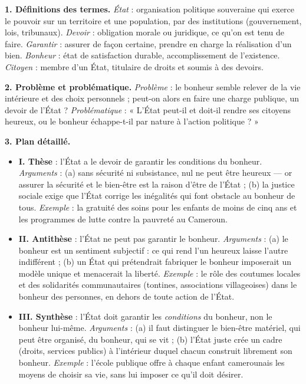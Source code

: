 \documentclass[11pt]{article}
\begin{document}
\begin{corrige}
\textbf{1. Définitions des termes.}
\emph{État} : organisation politique souveraine qui exerce le pouvoir sur un territoire et une population, par des institutions (gouvernement, lois, tribunaux). \emph{Devoir} : obligation morale ou juridique, ce qu'on est tenu de faire. \emph{Garantir} : assurer de façon certaine, prendre en charge la réalisation d'un bien. \emph{Bonheur} : état de satisfaction durable, accomplissement de l'existence. \emph{Citoyen} : membre d'un État, titulaire de droits et soumis à des devoirs.

\textbf{2. Problème et problématique.}
\emph{Problème} : le bonheur semble relever de la vie intérieure et des choix personnels ; peut-on alors en faire une charge publique, un devoir de l'État ? \emph{Problématique} : « L'État peut-il et doit-il rendre ses citoyens heureux, ou le bonheur échappe-t-il par nature à l'action politique ? »

\textbf{3. Plan détaillé.}
\begin{itemize}
\item \textbf{I. Thèse} : l'État a le devoir de garantir les conditions du bonheur. \emph{Arguments} : (a) sans sécurité ni subsistance, nul ne peut être heureux — or assurer la sécurité et le bien-être est la raison d'être de l'État ; (b) la justice sociale exige que l'État corrige les inégalités qui font obstacle au bonheur de tous. \emph{Exemple} : la gratuité des soins pour les enfants de moins de cinq ans et les programmes de lutte contre la pauvreté au Cameroun.
\item \textbf{II. Antithèse} : l'État ne peut pas garantir le bonheur. \emph{Arguments} : (a) le bonheur est un sentiment subjectif : ce qui rend l'un heureux laisse l'autre indifférent ; (b) un État qui prétendrait fabriquer le bonheur imposerait un modèle unique et menacerait la liberté. \emph{Exemple} : le rôle des coutumes locales et des solidarités communautaires (tontines, associations villageoises) dans le bonheur des personnes, en dehors de toute action de l'État.
\item \textbf{III. Synthèse} : l'État doit garantir les \emph{conditions} du bonheur, non le bonheur lui-même. \emph{Arguments} : (a) il faut distinguer le bien-être matériel, qui peut être organisé, du bonheur, qui se vit ; (b) l'État juste crée un cadre (droits, services publics) à l'intérieur duquel chacun construit librement son bonheur. \emph{Exemple} : l'école publique offre à chaque enfant camerounais les moyens de choisir sa vie, sans lui imposer ce qu'il doit désirer.
\end{itemize}


\end{corrige}
\end{document}
